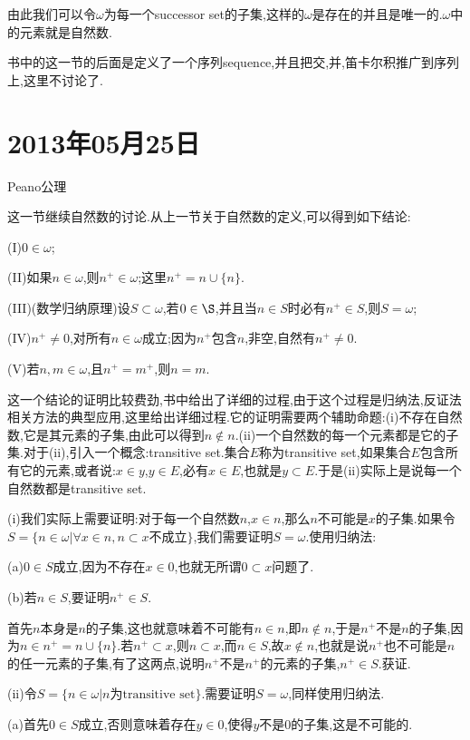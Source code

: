 \documentclass[12pt,a4paper,openany]{book}
\begin{document}
由此我们可以令$\omega$为每一个successor set的子集,这样的$\omega$是存在的并且是唯一的.$\omega$中的元素就是自然数.

书中的这一节的后面是定义了一个序列sequence,并且把交,并,笛卡尔积推广到序列上,这里不讨论了.

\section{2013年05月25日}
Peano公理

这一节继续自然数的讨论.从上一节关于自然数的定义,可以得到如下结论:

(I)$0 \in \omega$;

(II)如果$n \in \omega$,则$n^+ \in \omega$;这里$n^+= n \cup \{n\}$.

(III)(数学归纳原理)设$S \subset \omega$,若$0 \in \S$,并且当$n \in S$时必有$n^+ \in S$,则$S=\omega$;

(IV)$n^+ \neq 0$,对所有$n \in \omega$成立;因为$n^+$包含$n$,非空,自然有$n^+ \neq 0$.

(V)若$n,m \in \omega$,且$n^+=m^+$,则$n=m$.

这一个结论的证明比较费劲,书中给出了详细的过程,由于这个过程是归纳法,反证法相关方法的典型应用,这里给出详细过程.它的证明需要两个辅助命题:(i)不存在自然数,它是其元素的子集,由此可以得到$n \notin n$.(ii)一个自然数的每一个元素都是它的子集.对于(ii),引入一个概念:transitive set.集合$E$称为transitive set,如果集合$E$包含所有它的元素,或者说:$x \in y$,$y \in E$,必有$x \in E$,也就是$y \subset E$.于是(ii)实际上是说每一个自然数都是transitive set.

(i)我们实际上需要证明:对于每一个自然数$n$,$x \in n$,那么$n$不可能是$x$的子集.如果令$S=\{n \in \omega| \forall x\in n, n \subset x \text{不成立}\}$,我们需要证明$S = \omega$.使用归纳法:

(a)$0 \in S$成立,因为不存在$x \in 0$,也就无所谓$0 \subset x$问题了.

(b)若$n \in S$,要证明$n^+ \in S$.

首先$n$本身是$n$的子集,这也就意味着不可能有$n \in n$,即$n \notin n$,于是$n^+$不是$n$的子集,因为$n \in n^+=n \cup \{n\}$.若$n^+ \subset x$,则$n \subset x$,而$n \in S$,故$x \notin n$,也就是说$n^+$也不可能是$n$的任一元素的子集,有了这两点,说明$n^+$不是$n^+$的元素的子集,$n^+ \in S$.获证.

(ii)令$S = \{n \in \omega| n\text{为transitive set}\}$.需要证明$S = \omega$,同样使用归纳法.

(a)首先$0 \in S$成立,否则意味着存在$y \in 0$,使得$y$不是$0$的子集,这是不可能的.
\end{document}
